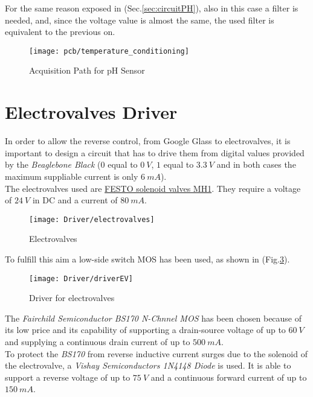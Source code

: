 For the same reason exposed in (Sec.\ref{sec:circuitPH}), also in this case a filter is needed, and, since the voltage value is almost the same, the used filter is equivalent to the previous on.\\

\begin{figure}[h]
	\centering
	\texttt{[image: pcb/temperature\_conditioning]}
	\caption{Acquisition Path for pH Sensor}
	\label{Fig:temperatureConditioning}
\end{figure}

 
\section{Electrovalves Driver} \label{sec:electrovalves}

In order to allow the reverse control, from Google Glass to electrovalves, it is important to design a circuit that has to drive them from digital values provided by the \textit{Beaglebone Black} ($0$ equal to $0\ V$, $1$ equal to $3.3\ V$ and in both cases the maximum suppliable current is only $6\ mA$).\\

The electrovalves used are \href{http://www.festo.com/net/SupportPortal/Files/10026/MH1_VO_ENUS.pdf}{FESTO solenoid valves MH1}. They require a voltage of $24\ V$ in DC and a current of $80\ mA$.\\

\begin{figure}[h]
	\centering
	\texttt{[image: Driver/electrovalves]}
	\caption{Electrovalves}
	\label{Fig:EV}
\end{figure}

To fulfill this aim a low-side switch MOS has been used, as shown in (Fig.\ref{Fig:driverEV}).

\begin{figure}[h]
	\centering
	\texttt{[image: Driver/driverEV]}
	\caption{Driver for electrovalves}
	\label{Fig:driverEV}
\end{figure}

The \textit{Fairchild Semiconductor BS170 N-Chnnel MOS} has been chosen because of its low price and its capability of supporting a drain-source voltage of up to $60\ V$ and supplying a continuous drain current of up to $500\ mA$.\\

To protect the \textit{BS170} from reverse inductive current surges due to the solenoid of the electrovalve, a \textit{Vishay Semiconductors 1N4148 Diode} is used. It is able to support  a reverse voltage of up to $75\ V$ and a continuous forward current of up to $150\ mA$.\\

